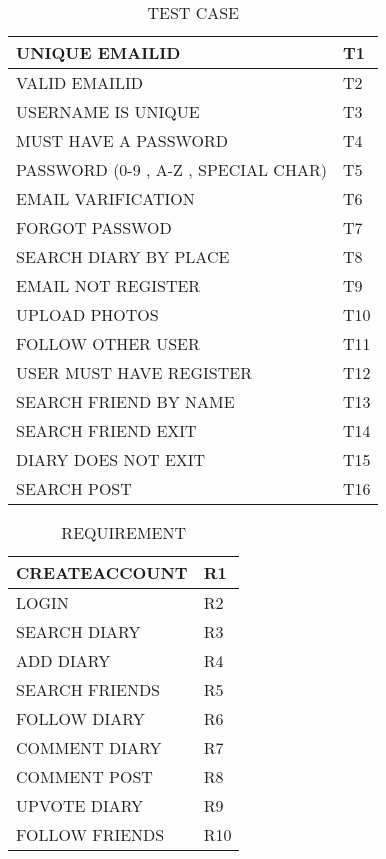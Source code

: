 \documentclass[]{article}
\begin{document}
\newpage
\begin{table}[]
\centering
\caption{TEST CASE}
\label{my-label}
\begin{tabular}{|l|l|}
\hline
 UNIQUE EMAILID &T1  \\ \hline
VALID EMAILID &T2\\ \hline
USERNAME IS UNIQUE&T3  \\ \hline
MUST HAVE A PASSWORD&T4 \\ \hline
PASSWORD (0-9 , A-Z , SPECIAL CHAR)&T5 \\ \hline
EMAIL VARIFICATION&T6  \\ \hline
 
FORGOT PASSWOD&T7 \\ \hline
SEARCH DIARY BY PLACE&T8 \\ \hline
EMAIL NOT REGISTER&T9 \\ \hline
UPLOAD PHOTOS&T10 \\ \hline
FOLLOW OTHER USER&T11  \\ \hline
USER MUST HAVE REGISTER&T12\\ \hline
SEARCH FRIEND BY NAME&T13 \\ \hline
SEARCH FRIEND EXIT&T14\\ \hline
DIARY DOES NOT EXIT&T15  \\ \hline
SEARCH POST&T16 \\ \hline
 
\end{tabular}
\end{table}

\begin{table}[]
\centering
\caption{REQUIREMENT}
\label{my-label}
\begin{tabular}{|l|l|}
\hline
CREATEACCOUNT  & R1  \\ \hline
LOGIN          & R2  \\ \hline
SEARCH DIARY   & R3  \\ \hline
ADD DIARY      & R4  \\ \hline
SEARCH FRIENDS & R5  \\ \hline
FOLLOW DIARY   & R6  \\ \hline
COMMENT DIARY  & R7  \\ \hline
COMMENT POST   & R8  \\ \hline
UPVOTE DIARY   & R9  \\ \hline
FOLLOW FRIENDS & R10 \\ \hline
\end{tabular}
\end{table}
\end{document}
